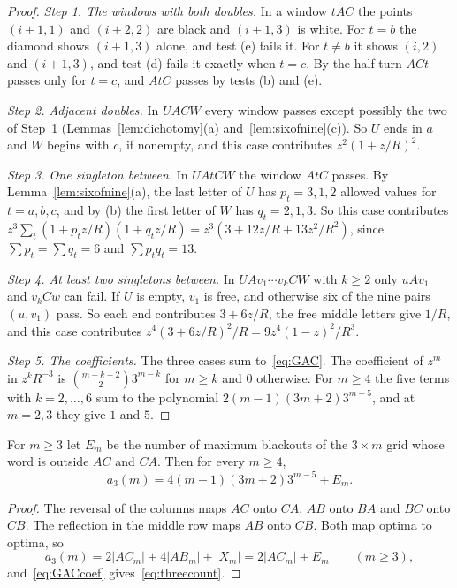 \begin{proof}
\emph{Step 1. The windows with both doubles.} In a window $tAC$ the points $(i+1,1)$ and
$(i+2,2)$ are black and $(i+1,3)$ is white. For $t=b$ the diamond shows $(i+1,3)$ alone, and
test (e) fails it. For $t\ne b$ it shows $(i,2)$ and $(i+1,3)$, and test (d) fails it exactly
when $t=c$. By the half turn $ACt$ passes only for $t=c$, and $AtC$ passes by tests (b) and (e).

\emph{Step 2. Adjacent doubles.} In $UACW$ every window passes except possibly the two of
Step~1 (Lemmas~\ref{lem:dichotomy}(a) and~\ref{lem:sixofnine}(c)). So $U$ ends in $a$ and $W$
begins with $c$, if nonempty, and this case contributes $z^2(1+z/R)^2$.

\emph{Step 3. One singleton between.} In $UAtCW$ the window $AtC$ passes. By
Lemma~\ref{lem:sixofnine}(a), the last letter of $U$ has $p_t=3,1,2$ allowed values for
$t=a,b,c$, and by (b) the first letter of $W$ has $q_t=2,1,3$. So this case contributes
$z^3\sum_t(1+p_tz/R)(1+q_tz/R)=z^3(3+12z/R+13z^2/R^2)$, since $\sum p_t=\sum q_t=6$ and
$\sum p_tq_t=13$.

\emph{Step 4. At least two singletons between.} In $UAv_1\cdots v_kCW$ with $k\ge2$ only
$uAv_1$ and $v_kCw$ can fail. If $U$ is empty, $v_1$ is free, and otherwise six of the nine
pairs $(u,v_1)$ pass. So each end contributes $3+6z/R$, the free middle letters give $1/R$, and
this case contributes $z^4(3+6z/R)^2/R=9z^4(1-z)^2/R^3$.

\emph{Step 5. The coefficients.} The three cases sum to~\eqref{eq:GAC}. The coefficient of $z^m$ in $z^kR^{-3}$ is
$\binom{m-k+2}23^{m-k}$ for $m\ge k$ and $0$ otherwise. For $m\ge4$ the five terms with
$k=2,\dots,6$ sum to the polynomial $2(m-1)(3m+2)3^{m-5}$, and at $m=2,3$ they give $1$ and $5$.
\end{proof}

\begin{theorem}\label{thm:threecount}
For $m\ge3$ let $E_m$ be the number of maximum blackouts of the $3\times m$ grid whose word is
outside $AC$ and $CA$. Then for every $m\ge4$,
\begin{equation}\label{eq:threecount}
a_3(m)=4(m-1)(3m+2)3^{m-5}+E_m.
\end{equation}
\end{theorem}

\begin{proof}
The reversal of the columns maps $AC$ onto $CA$, $AB$ onto $BA$ and $BC$ onto $CB$. The
reflection in the middle row maps $AB$ onto $CB$. Both map optima to optima, so
\begin{equation}\label{eq:classsum}
a_3(m)=2|AC_m|+4|AB_m|+|X_m|=2|AC_m|+E_m\qquad(m\ge3),
\end{equation}
and~\eqref{eq:GACcoef} gives~\eqref{eq:threecount}.
\end{proof}

